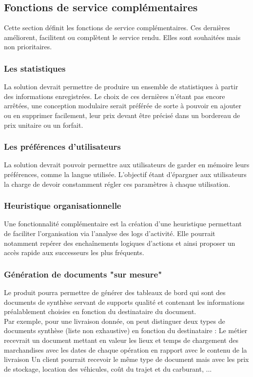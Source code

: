 \documentclass[11pt,fleqn]{book} %
\begin{document}
\subsection{Fonctions de service complémentaires}
Cette section définit les fonctions de service complémentaires. Ces dernières améliorent, facilitent ou complètent le service rendu. Elles sont souhaitées mais non prioritaires.

\subsubsection{Les statistiques}
La solution devrait permettre de produire un ensemble de statistiques à partir des informations enregistrées. Le choix de ces dernières n'étant pas encore arrêtées, une conception modulaire serait préférée de sorte à pouvoir en ajouter ou en supprimer facilement, leur prix devant être précisé dans un bordereau de prix unitaire ou un forfait.

\subsubsection{Les préférences d'utilisateurs}
La solution devrait pouvoir permettre aux utilisateurs de garder en mémoire leurs préférences, comme la langue utilisée. L'objectif étant d'épargner aux utilisateurs la charge de devoir constamment régler ces paramètres à chaque utilisation.

\subsubsection{Heuristique organisationnelle}
Une fonctionnalité complémentaire est la création d'une heuristique permettant de faciliter l'organisation via l'analyse des logs d'activité. Elle pourrait notamment repérer des enchaînements logiques d'actions et ainsi proposer un accès rapide aux successeurs les plus fréquents.

\subsubsection{Génération de documents "sur mesure"}
Le produit pourra permettre de générer des \og{}tableaux de bord\fg{} qui sont des documents de synthèse servant de supports qualité et contenant les informations préalablement choisies en fonction du destinataire du document.
\\
Par exemple, pour une livraison donnée, on peut distinguer deux types de documents synthèse (liste non exhaustive) en fonction du destinataire :
Le métier recevrait un document mettant en valeur les lieux et temps de chargement des marchandises avec les dates de chaque opération en rapport avec le contenu de la livraison
Un client pourrait recevoir le même type de document mais avec les prix de stockage, location des véhicules, coût du trajet et du carburant, ...
\end{document}

